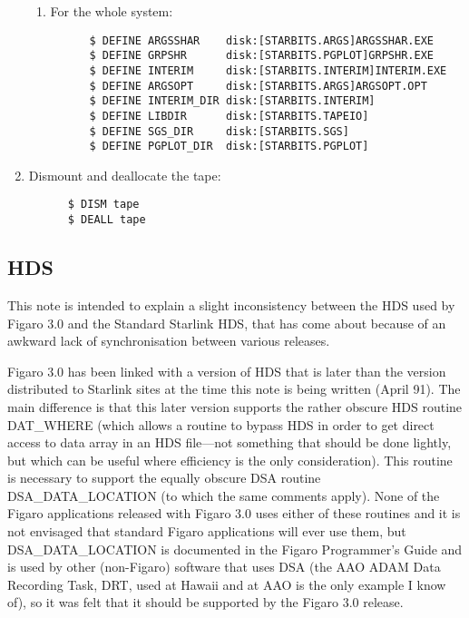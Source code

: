 \begin{enumerate}
\begin{enumerate}
\item For the whole system:

\begin{verbatim}
      $ DEFINE ARGSSHAR    disk:[STARBITS.ARGS]ARGSSHAR.EXE
      $ DEFINE GRPSHR      disk:[STARBITS.PGPLOT]GRPSHR.EXE
      $ DEFINE INTERIM     disk:[STARBITS.INTERIM]INTERIM.EXE
      $ DEFINE ARGSOPT     disk:[STARBITS.ARGS]ARGSOPT.OPT
      $ DEFINE INTERIM_DIR disk:[STARBITS.INTERIM]
      $ DEFINE LIBDIR      disk:[STARBITS.TAPEIO]
      $ DEFINE SGS_DIR     disk:[STARBITS.SGS]
      $ DEFINE PGPLOT_DIR  disk:[STARBITS.PGPLOT]
\end{verbatim}

\end{enumerate}

\item Dismount and deallocate the tape:

\begin{verbatim}
      $ DISM tape
      $ DEALL tape
\end{verbatim}

\end{enumerate}

\subsection{HDS}

This note is intended to explain a slight inconsistency between the HDS  used
by Figaro 3.0 and the Standard Starlink HDS, that has come about because of an
awkward lack of synchronisation between various releases.

Figaro 3.0 has been linked with a version of HDS that is later than the version
distributed to Starlink sites at the time this note is being written (April
91). The main difference is that this later version supports the rather
obscure HDS routine DAT\_WHERE (which allows a routine to bypass HDS in order
to get direct access to data array in an HDS file---not something that should
be done lightly, but which can be useful where efficiency is the only
consideration). This routine is necessary to support the equally obscure DSA
routine DSA\_DATA\_LOCATION (to which the same comments apply). None of the
Figaro applications released with Figaro 3.0 uses either of these routines and
it is not envisaged that standard Figaro applications will ever use them, but
DSA\_DATA\_LOCATION is documented in the Figaro Programmer's Guide and is used
by other (non-Figaro) software that uses DSA (the AAO ADAM Data Recording Task,
DRT, used at Hawaii and at AAO is the only example I know of), so it was felt
that it should be supported by the Figaro 3.0 release.

